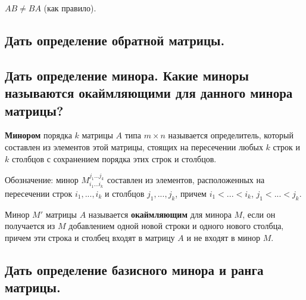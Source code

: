 $AB \ne BA$ (как правило).

\subsection{Дать определение обратной матрицы.}


\subsection{Дать определение минора. Какие миноры называются окаймляющими для данного минора матрицы?}

{\bf{Минором}} порядка $k$ матрицы $A$ типа $m\times n$ называется определитель, который составлен из элементов этой матрицы, стоящих на пересечении любых $k$ строк и $k$ столбцов с сохранением порядка этих строк и столбцов.

Обозначение: минор $M^{j_1 ... j_k}_{i_1 ... i_k}$ составлен из элементов, расположенных на пересечении строк $i_1, ..., i_k$ и столбцов $j_1, ..., j_k$, причем $i_1<...<i_k$, $j_1<...<j_k$.

\vspace*{15pt}

Минор $M'$ матрицы $A$ называется {\bf{окаймляющим}} для минора $M$, если он получается из $M$ добавлением одной новой строки и одного нового столбца, причем эти строка и столбец входят в матрицу $A$ и не входят в минор $M$.

\subsection{Дать определение базисного минора и ранга матрицы.}


\vspace*{15pt}


